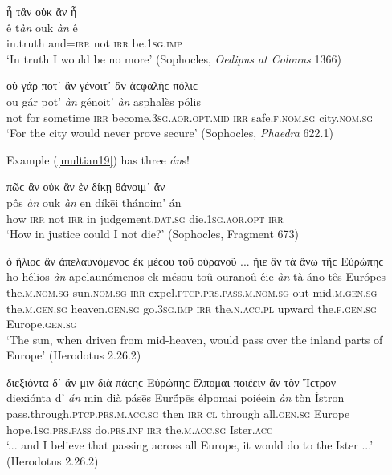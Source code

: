 \begin{exe}
\ex ἦ τἂν οὐκ ἂν ἦ\\
\gll ê t\emph{àn} ouk \emph{àn} ê\\
in.truth and=\textsc{irr} not \textsc{irr} be.\textsc{1sg.imp}\\
\trans `In truth I would be no more' (Sophocles, \textit{Oedipus at Colonus} 1366)
\label{multian17}
\end{exe}

\begin{exe}
\ex οὐ γάρ ποτ᾽ ἂν γένοιτ᾽ ἂν ἀϲφαλὴϲ πόλιϲ\\
\gll ou gár pot' \emph{àn} génoit' \emph{àn} asphalḕs pólis\\
not for sometime \textsc{irr} become.\textsc{3sg.aor.opt.mid} \textsc{irr} safe.\textsc{f.nom.sg} city.\textsc{nom.sg}\\
\trans `For the city would never prove secure' (Sophocles, \textit{Phaedra} 622.1)
\label{multian18}
\end{exe}

Example (\ref{multian19}) has three \textit{án}s!

\begin{exe}
\ex πῶϲ ἂν οὐκ ἂν ἐν δίκῃ θάνοιμ᾽ ἄν\\
\gll pôs \emph{àn} ouk \emph{àn} en díkēi thánoim' {án}\\
how \textsc{irr} not \textsc{irr} in judgement.\textsc{dat.sg} die.\textsc{1sg.aor.opt} \textsc{irr}\\
\trans `How in justice could I not die?' (Sophocles, Fragment 673)
\label{multian19}
\end{exe}

\begin{exe}
\ex ὁ ἥλιοϲ ἂν ἀπελαυνόμενοϲ ἐκ μέϲου τοῦ οὐρανοῦ ... ἤιε ἂν τὰ ἄνω τῆϲ Εὐρώπηϲ\\
\gll ho hḗlios \emph{àn} apelaunómenos ek mésou toû ouranoû ḗie \emph{àn} tà ánō tês Eurṓpēs\\
the.\textsc{m.nom.sg} sun.\textsc{nom.sg} \textsc{irr} expel.\textsc{ptcp.prs.pass.m.nom.sg} out mid.\textsc{m.gen.sg} the.\textsc{m.gen.sg} heaven.\textsc{gen.sg} go.\textsc{3sg.imp} \textsc{irr} the.\textsc{n.acc.pl} upward the.\textsc{f.gen.sg} Europe.\textsc{gen.sg}\\
\trans `The sun, when driven from mid-heaven, would pass over the inland parts of Europe' (Herodotus 2.26.2)
\label{multian20}
\end{exe}

\begin{exe}
\ex διεξιόντα δ᾽ ἄν μιν διὰ πάϲηϲ Εὐρώπηϲ ἔλπομαι ποιέειν ἂν τὸν Ἴϲτρον\\
\gll diexiónta d' \emph{án} min dià pásēs Eurṓpēs élpomai poiéein \emph{àn} tòn Ístron\\
pass.through.\textsc{ptcp.prs.m.acc.sg} then \textsc{irr} \textsc{cl} through all.\textsc{gen.sg} Europe hope.\textsc{1sg.prs.pass} do.\textsc{prs.inf} \textsc{irr} the.\textsc{m.acc.sg} Ister.\textsc{acc}\\
\trans `... and I believe that passing across all Europe, it would do to the Ister ...' (Herodotus 2.26.2)
\label{multian21}
\end{exe}

